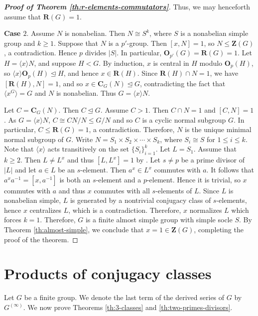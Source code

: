 \documentclass[twoside,a4paper,reqno,12pt]{amsart}
\newcommand{\<}{\langle}
\renewcommand{\>}{\rangle}
\newcommand{\la}{\langle}
\newcommand{\ra}{\rangle}
\newcommand{\leqs}{\leqslant}
\newcommand{\OB}{\mathbf{O}}
\newcommand{\CB}{\mathbf{C}}
\newcommand{\ZB}{\mathbf{Z}}
\newcommand{\RB}{\mathbf{R}}
\renewcommand{\leq}{\leqs}
\renewcommand{\:}{\colon}
\theoremstyle{definition}
\begin{document}
\begin{proof}[\textbf{Proof of Theorem \ref{th:r-elements-commutators}}]
 
  Thus, we may henceforth assume that $\RB(G)=1$.

\smallskip
 \textbf{Case $2$}.  Assume $N$ is nonabelian. Then $N\cong S^k$, where $S$ is a nonabelian simple group and $k\ge 1$. 
Suppose that $N$ is a $p'$-group. Then $[x,N]=1$, so  $N\leq \ZB(G)$, a contradiction.  Hence $p$ divides $|S|$. In particular, $\OB_{p'}(G)=\RB(G)=1.$ Let $H=\la x\ra N$, and suppose $H<G$. By induction, $x$ is central in $H$ modulo $\OB_p(H)$, so $\la x\ra \OB_p(H)\unlhd H$, and hence $x\in \RB(H)$. Since $\RB(H)\cap N=1$, we have $[\RB(H),N]=1$,  and so $x\in \CB_G(N)\unlhd G$, contradicting the fact that $\la x^G\ra=G$ and $N$ is nonabelian. Thus $G=\la x\ra N.$ 

Let $C=\CB_G(N). $ Then $C\unlhd G.$ Assume $C>1$. Then  $C\cap N=1$ and $[C,N]=1$. As $G=\la x\ra N$,  $C\cong CN/N\leq G/N$ and so $C$ is a cyclic normal subgroup $G$. In particular, $C\leq \RB(G)=1$, a contradiction. Therefore, $N$ is the unique minimal normal subgroup of $G$. Write $N=S_1\times S_2\times \cdots\times S_k$, where  $S_i\cong S$ for $1\leq i\leq k$. Note that $\la x\ra$ acts transitively on the set $\{S_i\}_{i=1}^k$.
Let $L=S_1$. Assume that $k\ge 2.$ Then $L\neq L^x$ and thus $[L,L^x]=1$ by \cite[31.5]{Aschbacher}. Let $s\neq p$ be a prime divisor of $|L|$ and let $a\in L$ be an $s$-element. Then $a^x\in L^x$ commutes with $a$. It follows that $a^xa^{-1}=[x,a^{-1}]$ is both an $s$-element and a $p$-element. Hence it is trivial, so $x$ commutes with $a$ and thus $x$ commutes with all $s$-elements of $L$. Since $L$ is nonabelian simple, $L$ is generated by a nontrivial conjugacy class of $s$-elements, hence $x$ centralizes $L$, which is a contradiction. Therefore, $x$ normalizes $L$ which forces $k=1$. Therefore, $G$ is a finite almost simple group with simple socle $S$. 
By Theorem \ref{th:almost-simple}, we conclude that $x=1\in \ZB(G)$, completing the proof of the theorem.
 \end{proof}


\section{Products of conjugacy classes}\label{sec4}
Let $G$ be a finite group. We denote the last term of the derived series of $G$ by $G^{(\infty)}$.
We now prove Theorems \ref{th:3-classes} and \ref{th:two-primes-divisors}.
\end{document}
